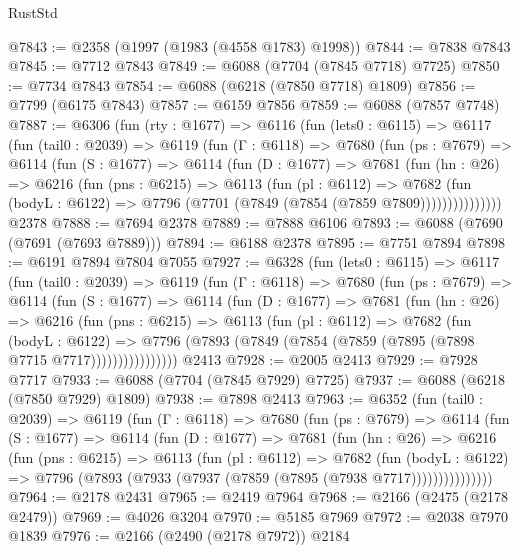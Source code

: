 \begin{lexlean}{RustStd}
\begin{coremodule}
@7843 := @2358 (@1997 (@1983 (@4558 @1783) @1998))
@7844 := @7838 @7843
@7845 := @7712 @7843
@7849 := @6088 (@7704 (@7845 @7718) @7725)
@7850 := @7734 @7843
@7854 := @6088 (@6218 (@7850 @7718) @1809)
@7856 := @7799 (@6175 @7843)
@7857 := @6159 @7856
@7859 := @6088 (@7857 @7748)
@7887 := @6306
    (fun (rty : @1677) =>
    @6116
      (fun (lets0 : @6115) =>
      @6117
        (fun (tail0 : @2039) =>
        @6119
          (fun (Γ : @6118) =>
          @7680
            (fun (ps : @7679) =>
            @6114
              (fun (S : @1677) =>
              @6114
                (fun (D : @1677) =>
                @7681
                  (fun (hn : @26) =>
                  @6216
                    (fun (pns : @6215) =>
                    @6113
                      (fun (pl : @6112) =>
                      @7682
                        (fun (bodyL : @6122) =>
                        @7796 (@7701 (@7849 (@7854 (@7859 @7809)))))))))))))))
    @2378
@7888 := @7694 @2378
@7889 := @7888 @6106
@7893 := @6088 (@7690 (@7691 (@7693 @7889)))
@7894 := @6188 @2378
@7895 := @7751 @7894
@7898 := @6191 @7894 @7804 @7055
@7927 := @6328
    (fun (lets0 : @6115) =>
    @6117
      (fun (tail0 : @2039) =>
      @6119
        (fun (Γ : @6118) =>
        @7680
          (fun (ps : @7679) =>
          @6114
            (fun (S : @1677) =>
            @6114
              (fun (D : @1677) =>
              @7681
                (fun (hn : @26) =>
                @6216
                  (fun (pns : @6215) =>
                  @6113
                    (fun (pl : @6112) =>
                    @7682
                      (fun (bodyL : @6122) =>
                      @7796 (@7893 (@7849 (@7854 (@7859 (@7895 (@7898 @7715 @7717))))))))))))))))
    @2413
@7928 := @2005 @2413
@7929 := @7928 @7717
@7933 := @6088 (@7704 (@7845 @7929) @7725)
@7937 := @6088 (@6218 (@7850 @7929) @1809)
@7938 := @7898 @2413
@7963 := @6352
    (fun (tail0 : @2039) =>
    @6119
      (fun (Γ : @6118) =>
      @7680
        (fun (ps : @7679) =>
        @6114
          (fun (S : @1677) =>
          @6114
            (fun (D : @1677) =>
            @7681
              (fun (hn : @26) =>
              @6216
                (fun (pns : @6215) =>
                @6113
                  (fun (pl : @6112) =>
                  @7682
                    (fun (bodyL : @6122) =>
                    @7796 (@7893 (@7933 (@7937 (@7859 (@7895 (@7938 @7717)))))))))))))))
@7964 := @2178 @2431
@7965 := @2419 @7964
@7968 := @2166 (@2475 (@2178 @2479))
@7969 := @4026 @3204
@7970 := @5185 @7969
@7972 := @2038 @7970 @1839
@7976 := @2166 (@2490 (@2178 @7972)) @2184

\end{coremodule}
\end{lexlean}
